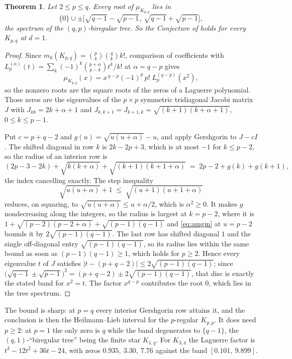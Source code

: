 \documentclass[11pt]{article}
\newtheorem{theorem}{Theorem}
\theoremstyle{remark}
\begin{document}
\begin{theorem}\label{thm:kpq}
Let $2\le p\le q$. Every root of $\mu_{K_{p,q}}$ lies in
\[
\{0\}\cup\pm\bigl[\sqrt{q-1}-\sqrt{p-1},\ \sqrt{q-1}+\sqrt{p-1}\bigr],
\]
the spectrum of the $(q,p)$-biregular tree. So the Conjecture of \cite{PartI} holds for
every $K_{p,q}$ at $d=1$.
\end{theorem}

\begin{proof}
Since $m_k(K_{p,q})=\binom pk\binom qk k!$, comparison of coefficients with
$L_p^{(\alpha)}(t)=\sum_k(-1)^k\binom{p+\alpha}{p-k}t^k/k!$ at $\alpha=q-p$ gives
\[
\mu_{K_{p,q}}(x)=x^{\,q-p}(-1)^p\,p!\;L_p^{(q-p)}(x^2),
\]
so the nonzero roots are the square roots of the zeros of a Laguerre polynomial.
Those zeros are the eigenvalues of the $p\times p$ symmetric tridiagonal Jacobi
matrix $J$ with $J_{kk}=2k+\alpha+1$ and $J_{k,k+1}=J_{k+1,k}=\sqrt{(k+1)(k+\alpha+1)}$,
$0\le k\le p-1$.

Put $c=p+q-2$ and $g(u)=\sqrt{u(u+\alpha)}-u$, and apply Gershgorin to $J-cI$. The
shifted diagonal in row $k$ is $2k-2p+3$, which is at most $-1$ for $k\le p-2$, so
the radius of an interior row is
\[
(2p-3-2k)+\sqrt{k(k+\alpha)}+\sqrt{(k+1)(k+1+\alpha)}\;=\;2p-2+g(k)+g(k+1),
\]
the index cancelling exactly. The step inequality
\begin{equation}\label{eq:amgm}
\sqrt{u(u+\alpha)}+1\;\le\;\sqrt{(u+1)(u+1+\alpha)}
\end{equation}
reduces, on squaring, to $\sqrt{u(u+\alpha)}\le u+\alpha/2$, which is
$\alpha^2\ge0$. It makes $g$ nondecreasing along the integers, so the radius is
largest at $k=p-2$, where it is $1+\sqrt{(p-2)(p-2+\alpha)}+\sqrt{(p-1)(q-1)}$ and
\eqref{eq:amgm} at $u=p-2$ bounds it by $2\sqrt{(p-1)(q-1)}$. The last row has
shifted diagonal $1$ and the single off-diagonal entry $\sqrt{(p-1)(q-1)}$, so its
radius lies within the same bound as soon as $(p-1)(q-1)\ge1$, which holds for
$p\ge2$. Hence every eigenvalue $t$ of $J$ satisfies
$|t-(p+q-2)|\le2\sqrt{(p-1)(q-1)}$; since
$\bigl(\sqrt{q-1}\pm\sqrt{p-1}\bigr)^2=(p+q-2)\pm2\sqrt{(p-1)(q-1)}$, that disc is
exactly the stated band for $x^2=t$. The factor $x^{q-p}$ contributes the root $0$,
which lies in the tree spectrum.
\end{proof}

The bound is sharp: at $p=q$ every interior Gershgorin row attains it, and the
conclusion is then the Heilmann--Lieb interval for the $p$-regular $K_{p,p}$. It
does need $p\ge2$: at $p=1$ the only zero is $q$ while the band degenerates to
$\{q-1\}$, the $(q,1)$-``biregular tree'' being the finite star $K_{1,q}$. For
$K_{3,4}$ the Laguerre factor is $t^3-12t^2+36t-24$, with zeros
$0.935,\ 3.30,\ 7.76$ against the band $[0.101,\ 9.899]$.
\end{document}
